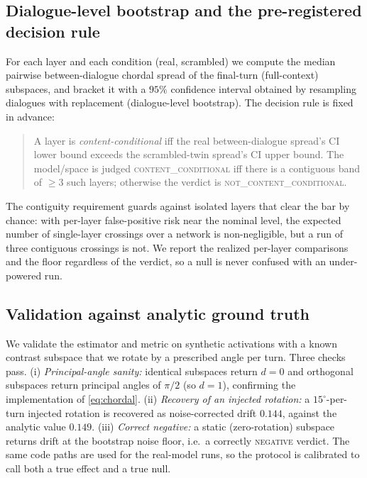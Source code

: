 \subsection{Dialogue-level bootstrap and the pre-registered decision rule}
\label{sec:rule}

For each layer and each condition (real, scrambled) we compute the median pairwise
between-dialogue chordal spread of the final-turn (full-context) subspaces, and bracket it
with a $95\%$ confidence interval obtained by resampling dialogues with replacement
(dialogue-level bootstrap). The decision rule is fixed in advance:
\begin{quote}
A layer is \emph{content-conditional} iff the real between-dialogue spread's CI lower bound
exceeds the scrambled-twin spread's CI upper bound. The model/space is judged
\textsc{content\_conditional} iff there is a contiguous band of $\geq 3$ such layers;
otherwise the verdict is \textsc{not\_content\_conditional}.
\end{quote}
The contiguity requirement guards against isolated layers that clear the bar by chance:
with per-layer false-positive risk near the nominal level, the expected number of
single-layer crossings over a network is non-negligible, but a run of three contiguous
crossings is not. We report the realized per-layer comparisons and the floor regardless of
the verdict, so a null is never confused with an under-powered run.

\subsection{Validation against analytic ground truth}
\label{sec:validation}

We validate the estimator and metric on synthetic activations with a known contrast
subspace that we rotate by a prescribed angle per turn. Three checks pass. (i)
\emph{Principal-angle sanity:} identical subspaces return $d = 0$ and orthogonal subspaces
return principal angles of $\pi/2$ (so $d = 1$), confirming the implementation of
\eqref{eq:chordal}. (ii) \emph{Recovery of an injected rotation:} a $15^\circ$-per-turn
injected rotation is recovered as noise-corrected drift $0.144$, against the analytic value
$0.149$. (iii) \emph{Correct negative:} a static (zero-rotation) subspace returns drift at
the bootstrap noise floor, i.e.\ a correctly \textsc{negative} verdict. The same code paths
are used for the real-model runs, so the protocol is calibrated to call both a true effect
and a true null.


